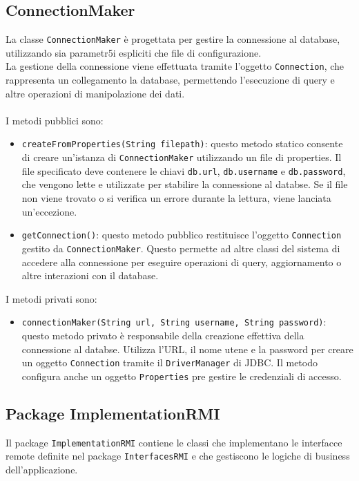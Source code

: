 \subsection{ConnectionMaker}
La classe \texttt{ConnectionMaker} è progettata per gestire la connessione al database, utilizzando sia parametr5i espliciti che file di configurazione.\\
La gestione della connessione viene effettuata tramite l'oggetto \texttt{Connection}, che rappresenta un collegamento la database, permettendo l'esecuzione di query e altre operazioni di manipolazione dei dati.\\
\\
I metodi pubblici sono:
\begin{itemize}
    \item \texttt{createFromProperties(String filepath)}:
          questo metodo statico consente di creare un'istanza di \texttt{ConnectionMaker} utilizzando un file di properties. Il file specificato deve contenere le chiavi \texttt{db.url}, \texttt{db.username} e \texttt{db.password},
          che vengono lette e utilizzate per stabilire la connessione al databse.
          Se il file non viene trovato o si verifica un errore durante la lettura, viene lanciata un'eccezione.
    \item \texttt{getConnection()}:
          questo metodo pubblico restituisce l'oggetto \texttt{Connection} gestito da \texttt{ConnectionMaker}. Questo permette ad altre classi del sistema di accedere alla connessione per eseguire operazioni di query, aggiornamento o altre interazioni con il database.
\end{itemize}
I metodi privati sono:
\begin{itemize}
    \item \texttt{connectionMaker(String url, String username, String password)}:
          questo metodo privato è responsabile della creazione effettiva della connessione al databse. Utilizza l'URL, il nome utene e la password per creare un oggetto \texttt{Connection} tramite il \texttt{DriverManager} di JDBC. Il metodo configura anche un oggetto \texttt{Properties} pre gestire le credenziali di accesso.
\end{itemize}




\subsection{Package ImplementationRMI}
Il package \texttt{ImplementationRMI} contiene le classi che implementano le interfacce remote definite nel package \texttt{InterfacesRMI} e che gestiscono le logiche di business dell'applicazione.\\


